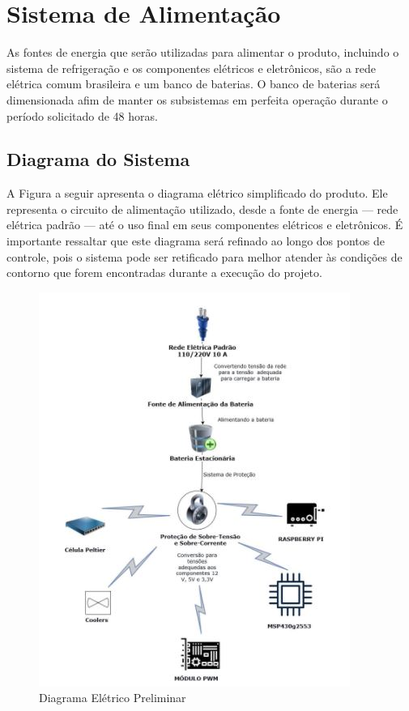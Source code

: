 \section{Sistema de Alimentação}
As fontes de energia que serão utilizadas para alimentar o produto, incluindo o sistema de refrigeração e os componentes elétricos e eletrônicos, são a rede elétrica comum brasileira e um banco de baterias. O banco de baterias será dimensionada afim de manter os subsistemas em perfeita operação durante o período solicitado de 48 horas.

\subsection{Diagrama do Sistema}
A Figura a seguir apresenta o diagrama elétrico simplificado do produto. Ele representa o circuito de alimentação utilizado, desde a fonte de energia --- rede elétrica padrão --- até o uso final em seus componentes elétricos e eletrônicos.  É importante ressaltar que este diagrama será refinado ao longo dos pontos de controle, pois o  sistema pode ser retificado para melhor atender às condições de contorno que forem encontradas durante a execução do projeto.

\begin{figure}[H]
\begin{center}
\includegraphics[scale = 1.2]{figuras/Diagrama_Simp.JPG}
\caption{ Diagrama Elétrico Preliminar}
\end{center}
\end{figure}

